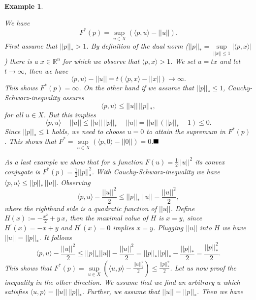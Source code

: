 \documentclass{scrreprt}
\newcommand{\qed}{$\hfill\blacksquare$}
\newtheorem{example}[theorem]{Example}
\newenvironment{proof}[1][Proof]{\begin{trivlist}
\item[\hskip \labelsep {\bfseries #1}]}{\end{trivlist}}
\begin{document}
\begin{example}
\begin{enumerate}
                \begin{proof}
                    We have
                        $$
                            F^{\ast}(p) = \sup_{u \in X} \left( \langle p, u \rangle - ||u|| \right).
                        $$
                    First assume that $||p||_{\ast} > 1$. By definition of the dual norm ($||p||_{\ast} = \sup\limits_{||x|| \le 1} |\langle p, x \rangle|$) there is a $x \in \mathbb{R}^{n}$ for which we observe that $\langle p, x \rangle > 1$. We set $u = tx$ and let $t \longrightarrow \infty$, then we have
                        $$
                            \langle p, u \rangle - ||u|| = t(\langle p, x \rangle - ||x||) \longrightarrow \infty.
                        $$
                    This shows $F^{\ast}(p) = \infty$. On the other hand if we assume that $||p||_{\ast} \le 1$, Cauchy-Schwarz-inequality assures
                        $$
                            \langle p, u \rangle \le ||u|| \, ||p||_{\ast},
                        $$
                    for all $u \in X$. But this implies
                        $$
                            \langle p, u \rangle - ||u|| \le ||u|| \, ||p||_{\ast} - ||u|| = ||u|| \, (||p||_{\ast} - 1) \le 0.
                        $$
                    Since $||p||_{\ast} \le 1$ holds, we need to choose $u = 0$ to attain the supremum in $F^{\ast}(p)$. This shows that $F^{\ast} = \sup\limits_{u \in X} \left( \langle p, 0 \rangle - ||0|| \right) = 0$.\qed
                \end{proof}
                \item As a last example we show that for a function $F(u) = \frac{1}{2} ||u||^{2}$ its convex conjugate is $F^{\ast}(p) = \frac{1}{2} ||p||_{\ast}^{2}$. With Cauchy-Schwarz-inequality we have $\langle p, u \rangle \le ||p||_{\ast}\,||u||$. Observing
                    $$
                        \langle p, u \rangle - \frac{||u||^{2}}{2} \le ||p||_{\ast}\,||u|| - \frac{||u||^{2}}{2},
                    $$
                where the righthand side is a quadratic function of $||u||$. Define $H(x) := -\frac{x^{2}}{2} + y\,x$, then the maximal value of $H$ is $x = y$, since $H^{'}(x) = -x + y$ and $H^{'}(x) = 0$ implies $x = y$. Plugging $||u||$ into $H$ we have $||u|| = ||p||_{\ast}$. It follows
                    $$
                        \langle p, u \rangle - \frac{||u||^{2}}{2} \le ||p||_{\ast}||u|| - \frac{||u||^{2}}{2} = ||p||_{\ast} ||p||_{\ast} - \frac{||p||_{\ast}}{2} = \frac{||p||_{\ast}^{2}}{2}.
                    $$
                This shows that $F^{\ast}(p) = \sup\limits_{u \in X} \left( \langle u, p \rangle - \frac{||u||_{2}^{2}}{2} \right) \le \frac{||p||_{\ast}^{2}}{2}$. Let us now proof the inequality in the other direction. We assume that we find an arbitrary $u$ which satisfies $\langle u, p \rangle = ||u||\,||p||_{\ast}$. Further, we assume that $||u|| = ||p||_{\ast}$. Then we have

\end{enumerate}
\end{example}
\end{document}
